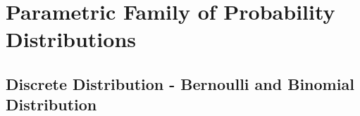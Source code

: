\documentclass[8pt, usepdftitle=false]{beamer}
\begin{document}










\section{Parametric Family of Probability Distributions}
\frame{\sectionpage}


\subsection{Discrete Distribution - Bernoulli and Binomial Distribution}
\frame{\subsectionpage}
\end{document}

